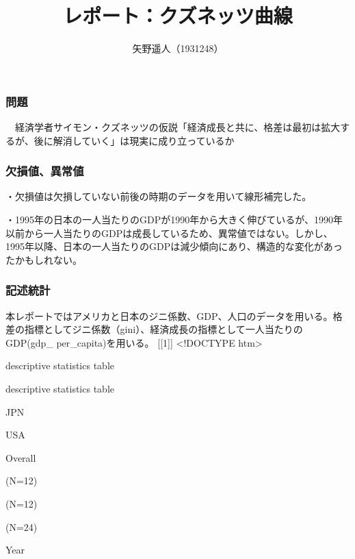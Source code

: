 \documentclass[
]{article}
\title{レポート：クズネッツ曲線}
\author{矢野遥人（1931248）}
\date{}
\begin{document}
\maketitle

\hypertarget{ux554fux984c}{%
\subsubsection{問題}\label{ux554fux984c}}

　経済学者サイモン・クズネッツの仮説「経済成長と共に、格差は最初は拡大するが、後に解消していく」は現実に成り立っているか

\hypertarget{ux6b20ux640dux5024ux7570ux5e38ux5024}{%
\subsubsection{欠損値、異常値}\label{ux6b20ux640dux5024ux7570ux5e38ux5024}}

・欠損値は欠損していない前後の時期のデータを用いて線形補完した。

・1995年の日本の一人当たりのGDPが1990年から大きく伸びているが、1990年以前から一人当たりのGDPは成長しているため、異常値ではない。しかし、1995年以降、日本の一人当たりのGDPは減少傾向にあり、構造的な変化があったかもしれない。

\hypertarget{ux8a18ux8ff0ux7d71ux8a08}{%
\subsubsection{記述統計}\label{ux8a18ux8ff0ux7d71ux8a08}}

本レポートではアメリカと日本のジニ係数、GDP、人口のデータを用いる。格差の指標としてジニ係数（gini）、経済成長の指標として一人当たりのGDP(gdp\_
per\_capita)を用いる。 {[}{[}1{]}{]} \textless!DOCTYPE htm\textgreater{}

descriptive statistics table

descriptive statistics table

{ }

{JPN}

{USA}

{Overall}

{}

{(N=12)}

{(N=12)}

{(N=24)}

{Year}

{}

{}

{}
\end{document}
